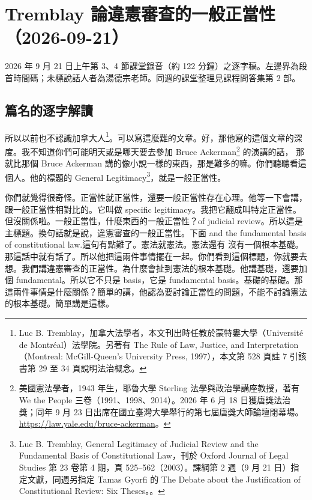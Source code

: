\chapter{Tremblay 論違憲審查的一般正當性（2026-09-21）}

2026 年 9 月 21 日上午第 3、4 節課堂錄音（約 122 分鐘）之逐字稿。左邊界為段首時間碼；未標說話人者為湯德宗老師。同週的課堂整理見課程問答集第 2 部。


\section{篇名的逐字解讀}

\hypertarget{w02:cue:1}{}所以以前也不認識加拿大人\footnote{Luc B. Tremblay，加拿大法學者，本文刊出時任教於蒙特婁大學（Université de Montréal）法學院。另著有 The Rule of Law, Justice, and Interpretation（Montreal: McGill-Queen's University Press, 1997），本文第 528 頁註 7 引該書第 29 至 34 頁說明法治概念。}。可以寫這麼難的文章。好，那他寫的這個文章的深度。我不知道你們可能明天或是哪天要去參加 Bruce Ackerman\footnote{美國憲法學者，1943 年生，耶魯大學 Sterling 法學與政治學講座教授，著有 We the People 三卷（1991、1998、2014）。2026 年 6 月 18 日獲唐獎法治獎；同年 9 月 23 日出席在國立臺灣大學舉行的第七屆唐獎大師論壇閉幕場。\url{https://law.yale.edu/bruce-ackerman}。} 的演講的話，
\hypertarget{w02:cue:2}{}那就比那個 Bruce Ackerman 講的像小說一樣的東西，那是難多的嘛。你們聽聽看這個人。他的標題的 General Legitimacy\footnote{Luc B. Tremblay, General Legitimacy of Judicial Review and the Fundamental Basis of Constitutional Law，刊於 Oxford Journal of Legal Studies 第 23 卷第 4 期，頁 525–562（2003）。課綱第 2 週（9 月 21 日）指定文獻，同週另指定 Tamas Gyorfi 的 The Debate about the Justification of Constitutional Review: Six Theses。\cite{tremblay2003}。}，就是一般正當性。

\hypertarget{w02:cue:3}{}你們就覺得很奇怪。正當性就正當性，還要一般正當性存在心理。他等一下會講，跟一般正當性相對比的。它叫做 specific legitimacy。我把它翻成叫特定正當性。但沒關係啦。一般正當性，什麼東西的一般正當性？of judicial review。所以這是主標題。換句話就是說，違憲審查的一般正當性。下面 and the fundamental basis of constitutional law.這句有點難了。憲法就憲法。憲法還有
\hypertarget{w02:cue:4}{}沒有一個根本基礎。那這話中就有話了。所以他把這兩件事情擺在一起。你們看到這個標題，你就要去想。我們講違憲審查的正當性。為什麼會扯到憲法的根本基礎。他講基礎，還要加個 fundamental。所以它不只是 basis，它是 fundamental basis。基礎的基礎。那這兩件事情是什麼關係？簡單的講，他認為要討論正當性的問題，不能不討論憲法的根本基礎。簡單講是這樣。

